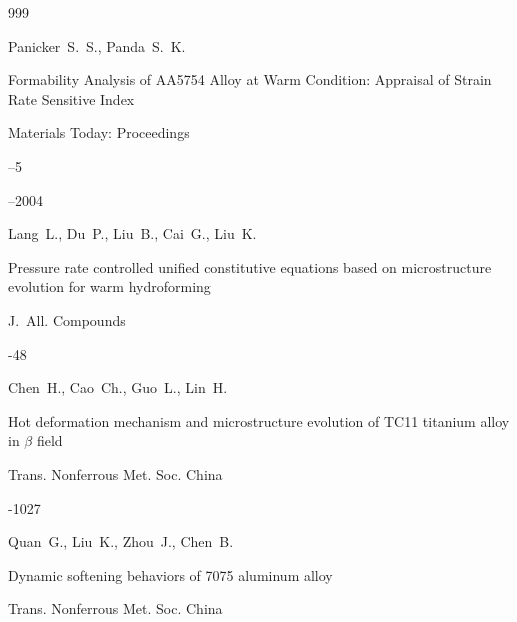 \begin{thebibliography}{999}

\by Panicker~S.~S., Panda~S.~K. 

\paper Formability Analysis of AA5754 Alloy at Warm Condition: Appraisal of Strain Rate Sensitive Index

\jour Materials Today: Proceedings



--5

--2004






\by Lang~L., Du~P., Liu~B., Cai~G., Liu~K.

\paper Pressure rate controlled unified constitutive equations based on microstructure evolution for warm hydroforming

\jour J.~All. Compounds



-48






\by Chen~H., Cao~Ch., Guo~L., Lin~H.

\paper Hot deformation mechanism and microstructure evolution of TC11 titanium alloy in $\beta$ field

\jour Trans. Nonferrous Met. Soc. China




-1027






\by Quan~G., Liu~K., Zhou~J., Chen~B.

\paper Dynamic softening behaviors of 7075 aluminum alloy

\jour Trans. Nonferrous Met. Soc. China



\end{thebibliography}
